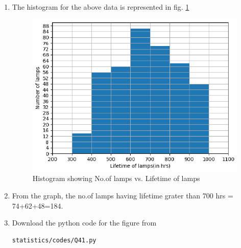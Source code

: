 \renewcommand{\theequation}{\theenumi}
\begin{enumerate}[label=\thesection.\arabic*.,ref=\thesection.\theenumi]
\item The histogram for the above data is represented in fig. \ref{fig:histogram}
\begin{figure}[!ht]
\centering
\includegraphics[width= \columnwidth]{./statistics/figs/Q41.eps}
\caption{Histogram showing No.of lamps vs. Lifetime of lamps}
\label{fig:histogram}
\end{figure}
\item From the graph, the no.of lamps having lifetime grater than 700 hrs = 74+62+48=184.
\item Download the python code for the figure from
\begin{lstlisting}
statistics/codes/Q41.py
\end{lstlisting}

\end{enumerate} 
